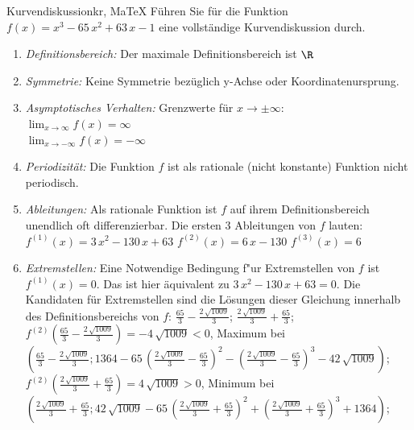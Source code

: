  \providecommand{\MoIl}{(} 
 \providecommand{\MoIr}{)}
 \providecommand{\MIntvlSep}{;} 
 \providecommand{\MElSetSep}{;} 
 \begin{MAufgabe}{Kurvendiskussion}{kr, MaTeX}
 F\"uhren Sie f\"ur die Funktion $f(x)=x^3 - 65\, x^2 + 63\, x - 1$ eine vollst\"andige Kurvendiskussion durch.\\ 
 \ifLsg\Loesung
 \begin{enumerate}
 \item \emph{Definitionsbereich:} 
 Der maximale Definitionsbereich ist $\R$\item \emph{Symmetrie:} 
 Keine Symmetrie bez\"uglich y-Achse oder Koordinatenursprung.\item \emph{Asymptotisches Verhalten:} 
 Grenzwerte f\"ur $x\rightarrow \pm \infty$: \\ 
 $\lim_{x\rightarrow \infty} f(x)=\infty$ \\ 
 $\lim_{x\rightarrow -\infty} f(x)=- \infty$ \\ 
 \item \emph{Periodizit\"at:} 
 Die Funktion $f$ ist als rationale (nicht konstante) Funktion nicht periodisch.\item \emph{Ableitungen:} 
 Als rationale Funktion ist $f$ auf ihrem Definitionsbereich unendlich oft differenzierbar. 
 Die ersten 3 Ableitungen von $f$ lauten: \\ 
 $f^{(1)}(x)=3\, x^2 - 130\, x + 63$\newline 
  $f^{(2)}(x)=6\, x - 130$\newline 
  $f^{(3)}(x)=6$\newline 
  \item \emph{Extremstellen:} 
 Eine Notwendige Bedingung f"ur Extremstellen von $f$ ist $f^{(1)}(x)=0$. 
 Das ist hier \"aquivalent zu $3\, x^2 - 130\, x + 63=0$. 
 Die Kandidaten f\"ur Extremstellen sind die L\"osungen dieser Gleichung innerhalb des Definitionsbereichs von $f$: $\frac{65}{3} - \frac{2\, \sqrt{1009}}{3}$; $\frac{2\, \sqrt{1009}}{3} + \frac{65}{3}$; \\ 
 $f^{(2)}(\frac{65}{3} - \frac{2\, \sqrt{1009}}{3})=- 4\, \sqrt{1009}$$<0$, Maximum bei $(\frac{65}{3} - \frac{2\, \sqrt{1009}}{3};1364 - 65\, {\left(\frac{2\, \sqrt{1009}}{3} - \frac{65}{3}\right)}^2 - {\left(\frac{2\, \sqrt{1009}}{3} - \frac{65}{3}\right)}^3 - 42\, \sqrt{1009})$; \\ 
 $f^{(2)}(\frac{2\, \sqrt{1009}}{3} + \frac{65}{3})=4\, \sqrt{1009}$$>0$, Minimum bei $(\frac{2\, \sqrt{1009}}{3} + \frac{65}{3};42\, \sqrt{1009} - 65\, {\left(\frac{2\, \sqrt{1009}}{3} + \frac{65}{3}\right)}^2 + {\left(\frac{2\, \sqrt{1009}}{3} + \frac{65}{3}\right)}^3 + 1364)$; \\ 

\end{enumerate}
\end{MAufgabe}
